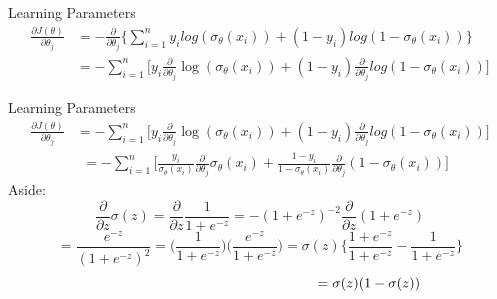 \documentclass{beamer}
\begin{document}
\begin{frame}{Learning Parameters}
\begin{align*}
\frac{\partial J(\theta)}{\partial \theta_{j}} &= -\frac{\partial }{\partial \theta_{j}} \bigg\{\sum_{i=1}^{n} y_{i} log(\sigma_{\theta}(x_{i})) + (1 - y_{i})log(1 - \sigma_{\theta}(x_{i}))\bigg\} \\
&= -\sum_{i=1}^{n}\bigg[y_{i}\frac{\partial}{\partial \theta_{j}} \log(\sigma_{\theta}(x_{i})) + (1-y_{i})\frac{\partial}{\partial \theta_{j}} log(1 - \sigma_{\theta}(x_{i}))\bigg]
\end{align*}
\end{frame}
\begin{frame}{Learning Parameters}
\begin{align*}
\frac{\partial J(\theta)}{\partial \theta_{j}} &= -\sum_{i=1}^{n}\bigg[y_{i}\frac{\partial}{\partial \theta_{j}} \log(\sigma_{\theta}(x_{i})) + (1-y_{i})\frac{\partial}{\partial \theta_{j}} log(1 - \sigma_{\theta}(x_{i}))\bigg]
\end{align*}
\begin{align}
&= -\sum_{i=1}^{n}\bigg[\frac{y_{i}}{\sigma_{\theta}(x_{i})} \frac{\partial}{\partial \theta_{j}} \sigma_{\theta}(x_{i}) + \frac{1 - y_{i}}{1 - \sigma_{\theta}(x_{i})} \frac{\partial}{\partial \theta_{j}}(1 - \sigma_{\theta}(x_{i}))\bigg]
\end{align}
Aside:
\begin{equation*}
\frac{\partial}{\partial z}\sigma(z) = \frac{\partial}{\partial z}\frac{1}{1 + e^{-z}} = -(1 + e^{-z})^{-2}\frac{\partial}{\partial z}(1 + e^{-z})
\end{equation*}
\begin{equation*}
= \frac{e^{-z}}{(1 + e^{-z})^{2}} = \bigg(\frac{1}{1 + e^{-z}}\bigg)\bigg(\frac{e^{-z}}{1 + e^{-z}}\bigg) = \sigma(z)\bigg\{\frac{1 + e^{-z}}{1 + e^{-z}} - \frac{1}{1 + e^{-z}}\bigg\}
\end{equation*}
\begin{equation*}
\hspace{5.5cm}= \sigma(z)(1 - \sigma(z))
\end{equation*}
\end{frame}
\end{document}
